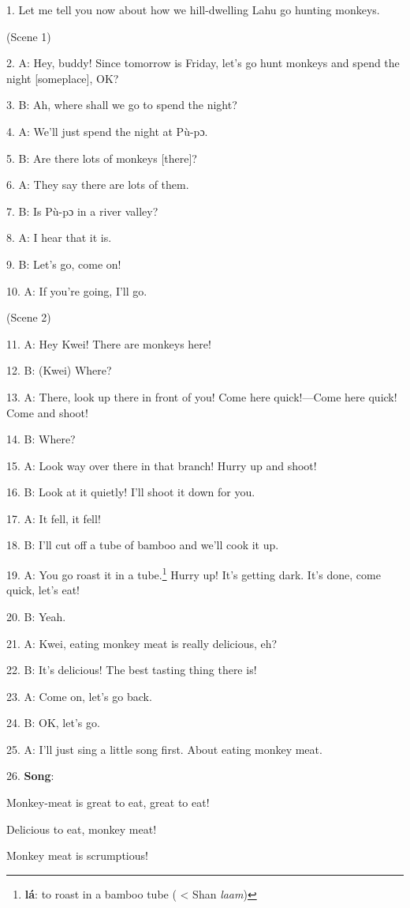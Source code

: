 \setcounter{footnote}{0}

1. Let me tell you now about how we hill-dwelling Lahu go hunting monkeys.

(Scene 1)

2. A: Hey, buddy! Since tomorrow is Friday, let's go hunt monkeys and spend the
night [someplace], OK?

3. B: Ah, where shall we go to spend the night?

4. A: We'll just spend the night at Pù-pɔ.

5. B: Are there lots of monkeys [there]?

6. A: They say there are lots of them.

7. B: Is Pù-pɔ in a river valley?

8. A: I hear that it is.

9. B: Let's go, come on!

10. A: If you're going, I'll go.

(Scene 2)

11. A: Hey Kwei! There are monkeys here!

12. B: (Kwei) Where?

13. A: There, look up there in front of you! Come here quick!---Come here quick!
Come and shoot!

14. B: Where?

15. A: Look way over there in that branch! Hurry up and shoot!

16. B: Look at it quietly! I'll shoot it down for you.

17. A: It fell, it fell!

18. B: I'll cut off a tube of bamboo and we'll cook it up.

19. A: You go roast it in a tube.\footnote{\textbf{lá}: to roast in a bamboo tube ( < Shan \textit{laam})} Hurry up! It's getting dark. It's done,
come quick, let's eat!

20. B: Yeah.

21. A: Kwei, eating monkey meat is really delicious, eh?

22. B: It's delicious! The best tasting thing there is!

23. A: Come on, let's go back.

24. B: OK, let's go.

25. A: I'll just sing a little song first. About eating monkey meat.

26. \textbf{Song}:

Monkey-meat is great to eat, great to eat!

Delicious to eat, monkey meat!

Monkey meat is scrumptious!

